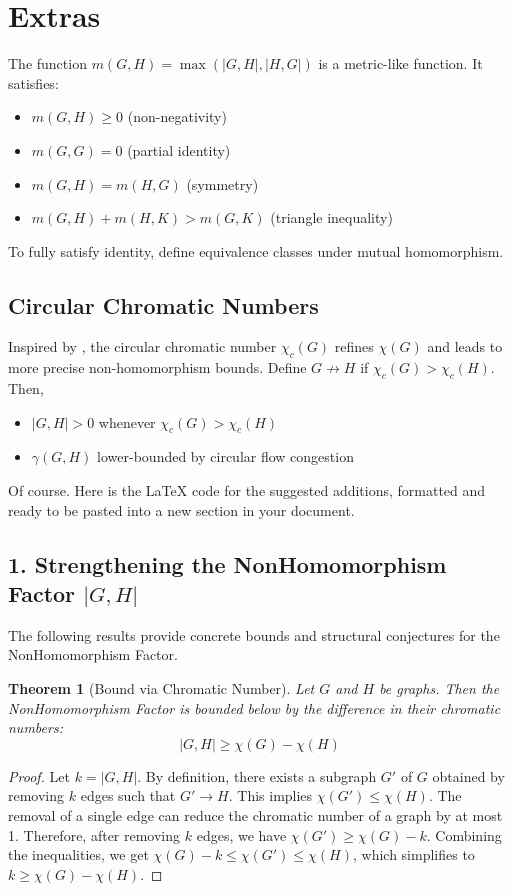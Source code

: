 \documentclass[11pt]{article}
\newtheorem{theorem}{Theorem}[section]
\begin{document}
\section{Extras}
The function $m(G,H) = \max(|G,H|,|H,G|)$ is a metric-like function. It satisfies:
\begin{itemize}
  \item $m(G,H) \geq 0$ (non-negativity)
  \item $m(G,G) = 0$ (partial identity)
  \item $m(G,H) = m(H,G)$ (symmetry)
  \item $m(G,H) + m(H,K) > m(G,K)$ (triangle inequality)
\end{itemize}

To fully satisfy identity, define equivalence classes under mutual homomorphism.




\subsection{Circular Chromatic Numbers}
Inspired by \cite{daneshgar}, the circular chromatic number $\chi_c(G)$ refines $\chi(G)$ and leads to more precise non-homomorphism bounds. Define $G \not\rightarrow H$ if $\chi_c(G) > \chi_c(H)$. Then,
\begin{itemize}
  \item $|G,H| > 0$ whenever $\chi_c(G) > \chi_c(H)$
  \item $\gamma(G,H)$ lower-bounded by circular flow congestion
\end{itemize}

Of course. Here is the LaTeX code for the suggested additions, formatted and ready to be pasted into a new section in your document.


\subsection*{1. Strengthening the NonHomomorphism Factor $|G,H|$}
The following results provide concrete bounds and structural conjectures for the NonHomomorphism Factor.

\begin{theorem}[Bound via Chromatic Number]
Let $G$ and $H$ be graphs. Then the NonHomomorphism Factor is bounded below by the difference in their chromatic numbers:
$$|G,H| \ge \chi(G) - \chi(H)$$
\end{theorem}

\begin{proof}
Let $k = |G,H|$. By definition, there exists a subgraph $G'$ of $G$ obtained by removing $k$ edges such that $G' \rightarrow H$. This implies $\chi(G') \le \chi(H)$. The removal of a single edge can reduce the chromatic number of a graph by at most 1. Therefore, after removing $k$ edges, we have $\chi(G') \ge \chi(G) - k$. Combining the inequalities, we get $\chi(G) - k \le \chi(G') \le \chi(H)$, which simplifies to $k \ge \chi(G) - \chi(H)$.
\end{proof}
\end{document}

